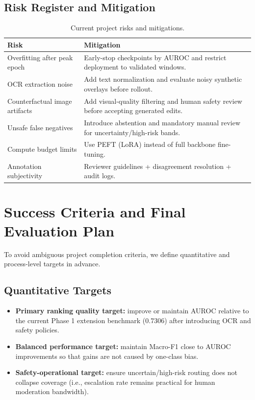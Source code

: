\documentclass[11pt]{article}
\begin{document}
\subsection{Risk Register and Mitigation}
\begin{table}[h]
\centering
\small
\caption{Current project risks and mitigations.}
\begin{tabularx}{\columnwidth}{lX}
\toprule
Risk & Mitigation \\
\midrule
Overfitting after peak epoch & Early-stop checkpoints by AUROC and restrict deployment to validated windows. \\
OCR extraction noise & Add text normalization and evaluate noisy synthetic overlays before rollout. \\
Counterfactual image artifacts & Add visual-quality filtering and human safety review before accepting generated edits. \\
Unsafe false negatives & Introduce abstention and mandatory manual review for uncertainty/high-risk bands. \\
Compute budget limits & Use PEFT (LoRA) instead of full backbone fine-tuning. \\
Annotation subjectivity & Reviewer guidelines + disagreement resolution + audit logs. \\
\bottomrule
\end{tabularx}
\label{tab:risks}
\end{table}

\section{Success Criteria and Final Evaluation Plan}
To avoid ambiguous project completion criteria, we define quantitative and process-level targets in advance.

\subsection{Quantitative Targets}
\begin{itemize}[leftmargin=*]
  \item \textbf{Primary ranking quality target:} improve or maintain AUROC relative to the current Phase 1 extension benchmark (0.7306) after introducing OCR and safety policies.
  \item \textbf{Balanced performance target:} maintain Macro-F1 close to AUROC improvements so that gains are not caused by one-class bias.
  \item \textbf{Safety-operational target:} ensure uncertain/high-risk routing does not collapse coverage (i.e., escalation rate remains practical for human moderation bandwidth).
\end{itemize}
\end{document}

